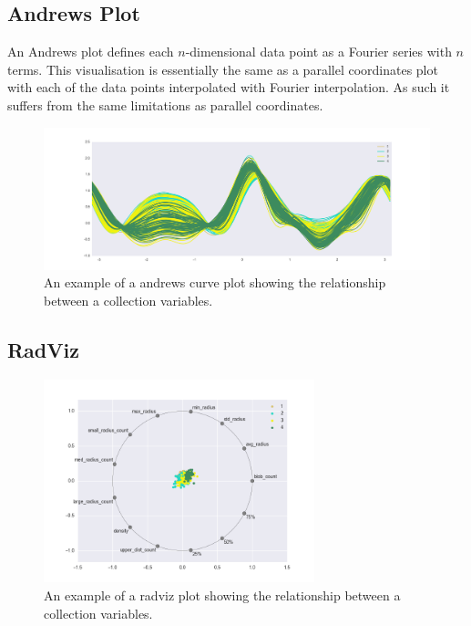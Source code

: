 \subsection{Andrews Plot}
An Andrews plot defines each $n$-dimensional data point as a Fourier series with $n$ terms. This visualisation is essentially the same as a parallel coordinates plot with each of the data points interpolated with Fourier interpolation. As such it suffers from the same limitations as parallel coordinates.

\begin{figure}[H]
	\label{fig:andrews-curve}
	\centering
	\includegraphics[width=1.0\textwidth]{Images/andrews-curve.png}	
	\caption{An example of a andrews curve plot showing the relationship between a collection variables.}
\end{figure}

\subsection{RadViz}

\begin{figure}[H]
	\label{fig:radviz-plot}
	\centering
	\includegraphics[width=0.7\textwidth]{Images/radviz-plot.png}	
	\caption{An example of a radviz plot showing the relationship between a collection variables.}
\end{figure}


